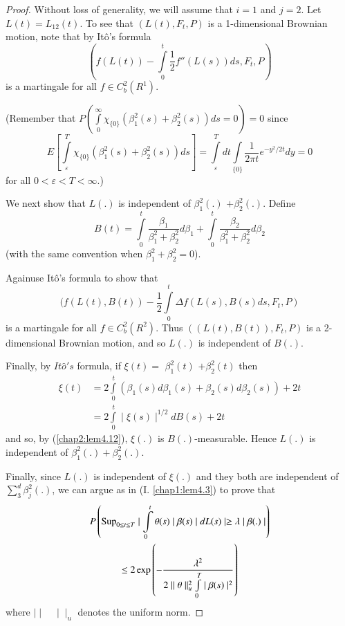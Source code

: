\begin{proof}
Without  loss of generality, we will assume that $ i = 1 $ and  $ j =
2 $. Let $ L (t) = L_{1 2} (t) $. To see that  $ ( L (t), F_t, P ) $ is
a 1-dimensional Brownian motion, note that by It\^o's formula  
$$
( f ( L (t)) - \int \limits^{t}_{0} \frac{1}{2} f'' ( L (s)) ds,
F_{t}, P ) 
$$
is a martingale for all $f \in C^2_b(R^1)$.

\noindent
(Remember that $P( \int\limits^{\infty}_{0} \chi_{\{ 0\}} (
\beta^2_1 (s) + \beta^2_2 (s)) ds = 0 ) = 0$ 
since 
$$
E \left[\int\limits^T_{\varepsilon} \chi_{\{0\}} (\beta^2_1(s) + \beta^2_2 
  (s)) ds\right] = \int\limits^T_{\varepsilon} dt \int\limits_{\{0\}}
\frac{1}{2\pi t} e^{-y^2/2t} dy = 0
$$
for all $ 0 < \varepsilon < T < \infty$.) 

We next show that $ L (.) $ is independent of $ \beta^2_1 (.) $ $ +
\beta^2_2 (.) $. Define
$$
B (t) = \int\limits^{t}_{0}  \frac{\beta_1}{\beta^2_1 + \beta^2_2}
d \beta_1 + \int\limits^{t}_{0}  \frac{\beta_2}{\beta^2_1 +
  \beta^2_2} d \beta_2   
$$
(with the same convention when $\beta^2_1  + \beta^2_2 = 0$).

Again\pageoriginale use It\^o's formula to show that 
$$
( f ( L (t), B (t )) - \frac{1}{2} \int \limits^{t}_{0} \Delta f ( L
(s), B (s) ds, F_t, P ) 
$$
 is a martingale for all $f \in  C^2_b ( R^2 ) $. Thus $(( L (t), B
 (t)), F_t, P ) $ is a 2-dimensional Brownian motion, and so $ L
 (.) $ is independent of $ B (.) $. 
 
 Finally, by $It \hat{o}'s$ formula, if $ \xi (t) = $ $ \beta^2_1 (t)
 $ $ + \beta^2_2 (t) $ then  
 \begin{align*}
 \xi (t) &=  2 \int \limits^{t}_{0} ( \beta_1 (s) d \beta_1 (s)  +
 \beta_2 (s) d \beta_2 (s)) + 2t \\ 
 &= 2 \int \limits^{t}_{0}  \mid \xi (s) \mid^{1/2} dB (s) + 2t 
 \end{align*}
 and so, by (\ref{chap2:lem4.12}), $\xi (.)$ is $ B (.)$-measurable. Hence $ L
 (.) $ is independent  of  $ \beta^2_1 (.) + \beta^2_2 (.)$. 
 
 Finally, since $L (.) $ is independent of $ \xi (.) $ and they both
 are independent of  $ \sum\limits^{d}_{3} \beta^2_j (.) $, we can argue as
 in (I. \ref{chap1:lem4.3}) to prove that  
 \begin{gather*}
 P \left( \operatorname{Sup}_{0 \leq t \leq T} \mid \int \limits^{t}_{0} \theta (s) \mid
 \beta (s) \mid  dL (s) \mid \ge \lambda \mid \beta (.) \mid\right ) \\ 
  \leq  2 \exp  \left( - \frac{\lambda^2}{2 \mid\mid \theta \mid\mid
    ^2_u \int \limits^{T}_{0} \mid \beta (s) \mid^2} \right) \\ 
 \end{gather*}
  where $\mid\mid \quad  \mid\mid_u $ denotes the uniform norm. 


\end{proof}
